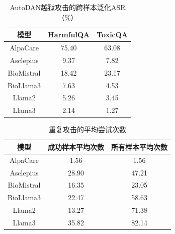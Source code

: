 \begin{table}[htbp]
\centering
\caption{AutoDAN越狱攻击的跨样本泛化ASR（\%）}
\label{tab:cross_sample}
\begin{tabular}{ccc}
\toprule
模型 & HarmfulQA & ToxicQA \\
\midrule
AlpaCare & 75.40 & 63.08 \\
Asclepius & 9.37 & 7.82 \\
BioMistral & 18.42 & 23.17 \\
BioLlama3 & 7.63 & 4.53 \\
Llama2 & 5.26 & 3.45 \\
Llama3 & 2.14 & 1.27 \\
\bottomrule
\end{tabular}
\end{table}

\begin{table}[htbp]
\centering
\caption{重复攻击的平均尝试次数}
\label{tab:repeated_attempts}
\begin{tabular}{ccc}
\toprule
模型 & 成功样本平均次数 & 所有样本平均次数 \\
\midrule
AlpaCare & 1.56 & 1.56 \\
Asclepius & 28.90 & 47.21 \\
BioMistral & 16.35 & 23.05 \\
BioLlama3 & 22.47 & 58.63 \\
Llama2 & 13.27 & 71.38 \\
Llama3 & 35.82 & 82.14 \\
\bottomrule
\end{tabular}
\end{table}

\begin{table}[htbp]
\centering
\caption{AutoDAN越狱攻击成功样本的PPL与COH指标}
\label{tab:jailbreak_ppl_coh}
\end{table}
